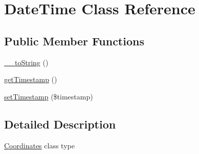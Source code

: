\hypertarget{classDateTime}{
\section{DateTime Class Reference}
\label{d3/d89/classDateTime}
}
\subsection*{Public Member Functions}
\begin{DoxyCompactItemize}
\item 
\hyperlink{classDateTime_a648239d574482dafc485a5b211983e88}{\_\-\_\-toString} ()
\item 
\hyperlink{classDateTime_a474b4a6fc7b8e43093f63ff933ab0f8c}{getTimestamp} ()
\item 
\hyperlink{classDateTime_a9497d4cf4778de0d8ce4e194b01d2db5}{setTimestamp} (\$timestamp)
\end{DoxyCompactItemize}


\subsection{Detailed Description}
\hyperlink{classCoordinates}{Coordinates} class type 

